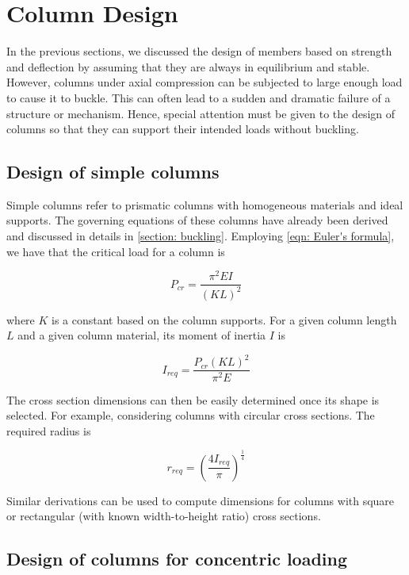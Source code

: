 \documentclass[
10pt,
a4paper,
openany,
svgnames,
]{book}
\begin{document}
\section{Column Design}

In the previous sections, we discussed the design of members based on strength and deflection by assuming that they are always in equilibrium and stable. However, columns under axial compression can be subjected to large enough load to cause it to buckle. This can often lead to a sudden and dramatic failure of a structure or mechanism. Hence, special attention must be given to the design of columns so that they can support their intended loads without buckling.

\subsection{Design of simple columns}

Simple columns refer to prismatic columns with homogeneous materials and ideal supports. The governing equations of these columns have already been derived and discussed in details in \cref{section: buckling}. Employing \cref{eqn: Euler's formula}, we have that the critical load for a column is

\[P_{cr} = \frac{\pi ^2EI}{(KL)^2}\]

where $K$ is a constant based on the column supports. For a given column length $L$ and a given column material, its moment of inertia $I$ is

\begin{equation}
  I_{req} = \frac{P_{cr}(KL)^2}{\pi ^2E}
\end{equation}

The cross section dimensions can then be easily determined once its shape is selected. For example, considering columns with circular cross sections. The required radius is

\begin{equation}
  r_{req} = \left( \frac{4I_{req}}{\pi } \right)^{\frac{1}{4}}
\end{equation}

Similar derivations can be used to compute dimensions for columns with square or rectangular (with known width-to-height ratio) cross sections.

\subsection{Design of columns for concentric loading} \label{subsection: column concentric loading}
\end{document}
